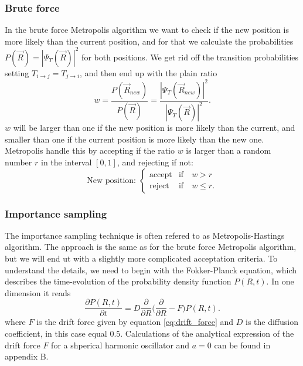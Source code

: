 \documentclass[norsk,a4paper,12pt]{article}
\begin{document}
\subsubsection{Brute force}
In the brute force Metropolis algorithm we want to check if the new position is more likely than the current position, and for that we calculate the probabilities $P(\vec{R})=|\Psi_T(\vec{R})|^2$ for both positions. We get rid off the transition probabilities setting $T_{i\rightarrow j}=T_{j\rightarrow i}$, and then end up with the plain ratio
\begin{equation}
w=\frac{P(\vec{R}_{new})}{P(\vec{R})}=\frac{|\Psi_T(\vec{R}_{new})|^2}{|\Psi_T(\vec{R})|^2}.
\end{equation}
$w$ will be larger than one if the new position is more likely than the current, and smaller than one if the current position is more likely than the new one. Metropolis handle this by accepting if the ratio $w$ is larger than a random number $r$ in the interval $[0,1]$, and rejecting if not:
\begin{equation}
\text{New position: }
\begin{cases} 
   \text{accept} & \text{if}\quad w > r \\
   \text{reject} & \text{if}\quad w \leq r.
\end{cases}
\end{equation}

\subsubsection{Importance sampling} \label{Importance_sampling}
The importance sampling technique is often refered to as Metropolis-Hastings algorithm. The approach is the same as for the brute force Metropolis algorithm, but we will end ut with a slightly more complicated acceptation criteria. To understand the details, we need to begin with the Fokker-Planck equation, which describes the time-evolution of the probability density function $P(R,t)$. In one dimension it reads
\begin{equation}
\frac{\partial P(R,t)}{\partial t} = D\frac{\partial}{\partial R}\bigg(\frac{\partial}{\partial R} - F\bigg)P(R,t).
\end{equation}
where $F$ is the drift force given by equation \ref{eq:drift_force} and $D$ is the diffusion coefficient, in this case equal $0.5$. Calculations of the analytical expression of the drift force $F$ for a shperical harmonic oscillator and $a=0$ can be found in appendix B.
\end{document}
